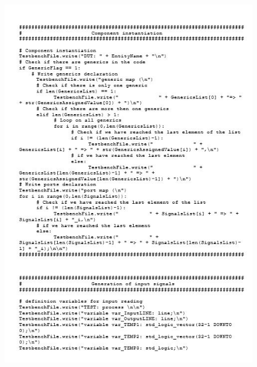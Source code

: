 \begin{figure}[!htb]
	\centering
	\includegraphics[scale=1.2]{immagini/tbgen5}
	\label{tbgen5}
\end{figure}
